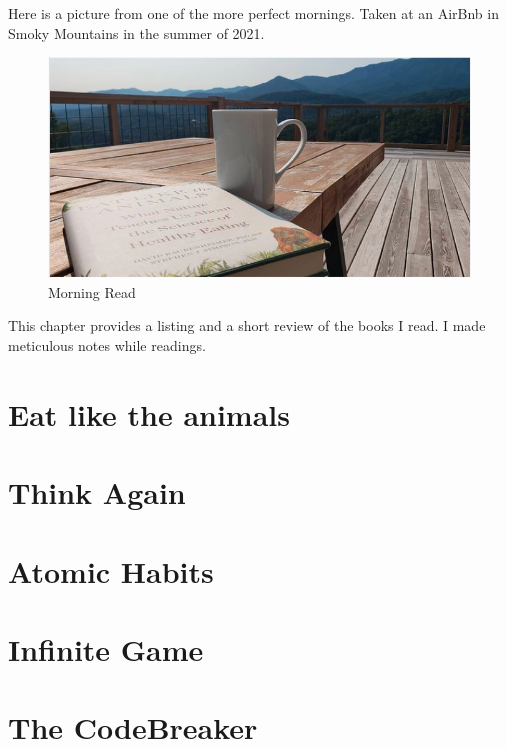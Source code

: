 \documentclass[
  oneside]{book}
\begin{document}
Here is a picture from one of the more perfect mornings. Taken at an AirBnb in Smoky Mountains in the summer of 2021.

\begin{figure}
\centering
\includegraphics{pictures/smoky_morning.png}
\caption{Morning Read}
\end{figure}

This chapter provides a listing and a short review of the books I read. I made meticulous notes while readings.

\hypertarget{eat-like-the-animals}{%
\section{Eat like the animals}\label{eat-like-the-animals}}

\hypertarget{think-again}{%
\section{Think Again}\label{think-again}}

\hypertarget{atomic-habits}{%
\section{Atomic Habits}\label{atomic-habits}}

\hypertarget{infinite-game}{%
\section{Infinite Game}\label{infinite-game}}

\hypertarget{the-codebreaker}{%
\section{The CodeBreaker}\label{the-codebreaker}}
\end{document}
